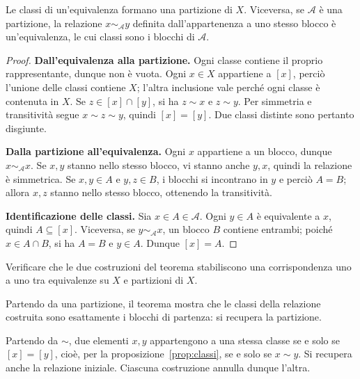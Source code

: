 \begin{teorema}\label{teo:partizioni}
Le classi di un'equivalenza formano una partizione di $X$. Viceversa, se $\mathcal A$ è una partizione, la relazione $x\sim_{\mathcal A}y$ definita dall'appartenenza a uno stesso blocco è un'equivalenza, le cui classi sono i blocchi di $\mathcal A$.
\end{teorema}
\begin{proof}
\textbf{Dall'equivalenza alla partizione.} Ogni classe contiene il proprio rappresentante, dunque non è vuota. Ogni $x\in X$ appartiene a $[x]$, perciò l'unione delle classi contiene $X$; l'altra inclusione vale perché ogni classe è contenuta in $X$. Se $z\in[x]\cap[y]$, si ha $z\sim x$ e $z\sim y$. Per simmetria e transitività segue $x\sim z\sim y$, quindi $[x]=[y]$. Due classi distinte sono pertanto disgiunte.

\textbf{Dalla partizione all'equivalenza.} Ogni $x$ appartiene a un blocco, dunque $x\sim_{\mathcal A}x$. Se $x,y$ stanno nello stesso blocco, vi stanno anche $y,x$, quindi la relazione è simmetrica. Se $x,y\in A$ e $y,z\in B$, i blocchi si incontrano in $y$ e perciò $A=B$; allora $x,z$ stanno nello stesso blocco, ottenendo la transitività.

\textbf{Identificazione delle classi.} Sia $x\in A\in\mathcal A$. Ogni $y\in A$ è equivalente a $x$, quindi $A\subseteq[x]$. Viceversa, se $y\sim_{\mathcal A}x$, un blocco $B$ contiene entrambi; poiché $x\in A\cap B$, si ha $A=B$ e $y\in A$. Dunque $[x]=A$.
\end{proof}

\begin{schema}
\end{schema}

\begin{esercizio}
Verificare che le due costruzioni del teorema stabiliscono una corrispondenza uno a uno tra equivalenze su $X$ e partizioni di $X$.
\end{esercizio}
\begin{svolgimento}
Partendo da una partizione, il teorema mostra che le classi della relazione costruita sono esattamente i blocchi di partenza: si recupera la partizione.

Partendo da $\sim$, due elementi $x,y$ appartengono a una stessa classe se e solo se $[x]=[y]$, cioè, per la proposizione~\ref{prop:classi}, se e solo se $x\sim y$. Si recupera anche la relazione iniziale. Ciascuna costruzione annulla dunque l'altra.
\end{svolgimento}

